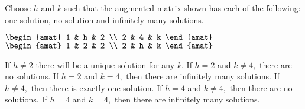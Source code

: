 
\begin{Exercise}[
name={},
title={}, 
difficulty=0,
origin={\cite{KK}}]
Choose $h$ and $k$ such that the augmented matrix shown has each of the following: 
one solution, no solution and infinitely many solutions.
\begin{multicols}{2}
\Question $
\begin{amat}{2}
1 & h & 2 \\
2 & 4 & k
\end{amat}$
\Question $
\begin{amat}{2}
1 & 2 & 2 \\
2 & h & k
\end{amat}$
\EndCurrentQuestion
\end{multicols}
\end{Exercise}

\begin{Answer}
\Question If $h\neq 2$ there will be a unique solution for any $k$. If $h=2$ and $%
k\neq 4,$ there are no solutions. If $h=2$ and $k=4,$ then there are
infinitely many solutions.
\Question If $h\neq 4,$ then there is exactly one solution. If $h=4$ and $k\neq 4,$
then there are no solutions. If $h=4$ and $k=4,$ then there are infinitely
many solutions.
\end{Answer}
